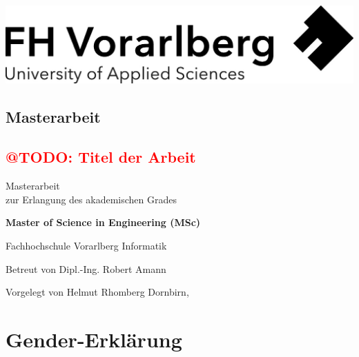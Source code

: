 \documentclass[a4paper,12pt, twoside]{scrreprt}
\begin{document}
\cleardoublepage   %
\thispagestyle{empty}
\begin{titlepage}
  \begin{flushright}
  \includegraphics[width=0.4\linewidth]{Logo-A3}
  \end{flushright}
  \begin{flushleft}
  \section*{Masterarbeit} %
  \subsection*{\textcolor{red}{@TODO: Titel der Arbeit}}
  \vspace{1cm}
  
  Masterarbeit\\
  zur Erlangung des akademischen Grades
  \vspace{0.5cm}
  
  \textbf{Master of Science in Engineering (MSc)} %

  \vspace{1cm}
  Fachhochschule Vorarlberg\newline
  Informatik %

  \vspace{0.5cm}
  
  Betreut von\newline
  Dipl.-Ing. Robert Amann %
  
  \vspace{0.5cm}
  
  Vorgelegt von\newline
  Helmut Rhomberg\newline\newline %
  Dornbirn, \todayWithoutDay %
  \end{flushleft}
\end{titlepage}

\newpage
\section*{Gender-Erklärung}

\end{document}
